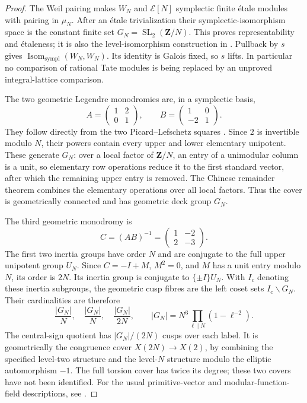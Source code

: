 \begin{proof}
The Weil pairing makes $W_N$ and $\mathcal E[N]$ symplectic
finite \'{e}tale modules with pairing in $\mu_N$.
After an \'{e}tale trivialization their symplectic-isomorphism
space is the constant finite set
$G_N=\operatorname{SL}_2(\mathbf Z/N)$.
This proves representability and \'{e}taleness; it is also the
level-isomorphism construction in
\citep[\S17, Proposition~17.6]{D_ConradModularNotes}.
Pullback by $s$ gives $\operatorname{Isom}_{\mathrm{sympl}}(W_N,W_N)$.
Its identity is Galois fixed, so $s$ lifts.
In particular no comparison of rational Tate modules is being
replaced by an unproved integral-lattice comparison.

The two geometric Legendre monodromies are, in a symplectic basis,
\[
 A=\begin{pmatrix}1&2\\0&1\end{pmatrix},\qquad
 B=\begin{pmatrix}1&0\\-2&1\end{pmatrix}.
 \tag{D.32.4}
\]
They follow directly from the two Picard--Lefschetz squares
\citep[\S1.1, pp.~20--21]{D_CarlsonMullerStachPeters2017}.
Since $2$ is invertible modulo $N$, their powers contain every
upper and lower elementary unipotent.
These generate $G_N$: over a local factor of $\mathbf Z/N$,
an entry of a unimodular column is a unit, so elementary row
operations reduce it to the first standard vector, after which
the remaining upper entry is removed. The Chinese remainder
theorem combines the elementary operations over all local factors.
Thus the cover is geometrically connected and has geometric
deck group $G_N$.

The third geometric monodromy is
\[
 C=(AB)^{-1}=\begin{pmatrix}1&-2\\2&-3\end{pmatrix}.
 \tag{D.32.5}
\]
The first two inertia groups have order $N$ and are conjugate
to the full upper unipotent group $U_N$.
Since $C=-I+M$, $M^2=0$, and $M$ has a unit entry modulo $N$,
its order is $2N$. Its inertia group is conjugate to
$\{\pm I\}U_N$.
With $I_c$ denoting these inertia subgroups, the geometric
cusp fibres are the left coset sets $I_c\backslash G_N$.
Their cardinalities are therefore
\[
 \frac{|G_N|}{N},\quad
 \frac{|G_N|}{N},\quad
 \frac{|G_N|}{2N},
 \qquad
 |G_N|=N^3\prod_{\ell\mid N}(1-\ell^{-2}).
 \tag{D.32.6}
\]
The central-sign quotient has $|G_N|/(2N)$ cusps over
each label. It is geometrically the congruence cover
$X(2N)\to X(2)$, by combining the specified level-two
structure and the level-$N$ structure modulo the elliptic
automorphism $-1$. The full torsion cover has twice its degree;
these two covers have not been identified.
For the usual primitive-vector and modular-function-field
descriptions, see
\citep[Lemma~2.1 and Proposition~2.2, pp.~1206--1207]
{D_SutherlandZywina2017}.


\end{proof}

